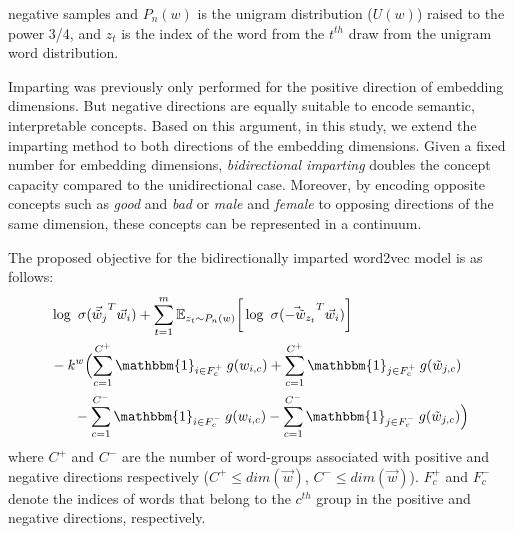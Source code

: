 \documentclass[11pt,a4paper]{article}
\newcommand{\indicator}{\ensuremath{\mathbbm{1}}}
\begin{document}
negative samples and $P_n(w)$ is the unigram distribution
($U(w)$) raised to the power 3/4, and $z_t$ is the index of the word from the $t^{th}$ draw from the unigram word distribution.


Imparting was previously only performed
for the positive direction of embedding dimensions.
But negative directions are equally suitable to encode semantic, interpretable concepts. Based on this argument, in this study, we extend the imparting method to both directions of the embedding dimensions. 
Given a fixed number for embedding dimensions, \textit{bidirectional imparting} doubles the concept capacity compared to the unidirectional case. Moreover, by encoding opposite concepts such as \textit{good} and \textit{bad} or \textit{male} and \textit{female} to opposing directions of the same dimension, these concepts can be represented in a continuum.

The proposed objective for the bidirectionally imparted word2vec model is as follows:
\begin{align}
\begin{split}
& \log ~ \sigma ({\vec{\tilde{w}}_{j}}^T \vec{w}_{i}) + \sum_{t = 1}^{m} {\mathbb{E}}_{z_t \sim P_n(w)} \bigg[ \log ~ \sigma({\vec{-\tilde{w}}_{z_t}}^T \vec{w}_{i}) \bigg] \\ 
& -k^w \Bigl(  \sum_{c=1}^{C^+} \indicator_{i\in{}F^+_c} \: g(w_{i,c}) + \sum_{c=1}^{C^+} \indicator_{j \in F^+_c} \: g(\tilde{w}_{j,c}) \\
& ~~~~~ - \sum_{c=1}^{C^-} \indicator_{i\in{}F^-_c} \: g(w_{i,c}) - \sum_{c=1}^{C^-} \indicator_{j \in F^-_c} \: g(\tilde{w}_{j,c}) \Bigr)
\end{split}
\label{eq:word2vec_bi}
\end{align}
where $C^+$ and $C^-$ are the number of word-groups associated with positive and negative directions respectively ($C^+ \leq dim(\vec{w})$, $C^- \leq dim(\vec{w})$). $F^+_c$ and $F^-_c$ denote the indices of words that belong to the $c^{th}$ group in the positive and negative directions, respectively. 
\end{document}
